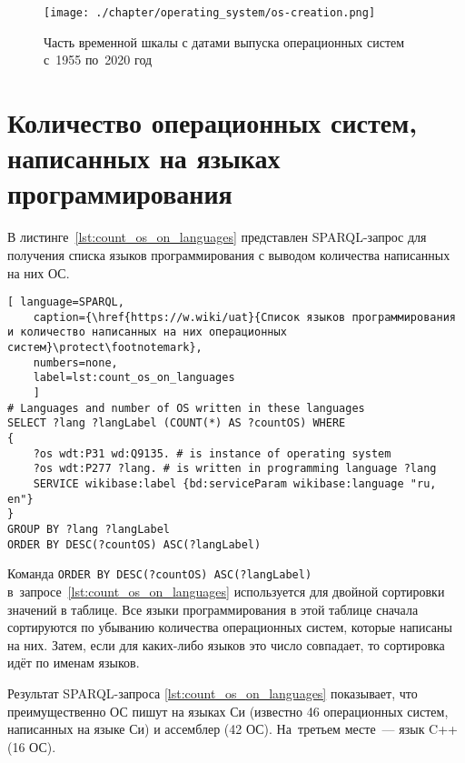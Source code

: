 \begin{figure*}[h!]
	\texttt{[image: ./chapter/operating\_system/os-creation.png]}
    \caption[Часть временной шкалы с датами выпуска ОС.]{Часть временной шкалы с датами выпуска операционных систем с~1955 по~2020 год}%
	\label{fig:os_creation}
\end{figure*}





\section{Количество операционных систем, написанных на языках программирования}

В листинге~\ref{lst:count_os_on_languages} представлен SPARQL-запрос для получения списка языков программирования с выводом количества написанных на них ОС.

\begin{lstlisting}[ language=SPARQL, 
	caption={\href{https://w.wiki/uat}{Список языков программирования и количество написанных на них операционных систем}\protect\footnotemark},
    numbers=none,
	label=lst:count_os_on_languages
	]
# Languages and number of OS written in these languages
SELECT ?lang ?langLabel (COUNT(*) AS ?countOS) WHERE 
{
	?os wdt:P31 wd:Q9135. # is instance of operating system
	?os wdt:P277 ?lang. # is written in programming language ?lang
    SERVICE wikibase:label {bd:serviceParam wikibase:language "ru, en"}
}
GROUP BY ?lang ?langLabel
ORDER BY DESC(?countOS) ASC(?langLabel)
\end{lstlisting}



\newpage\phantom{blabla}
\newpage
Команда \lstinline|ORDER BY DESC(?countOS) ASC(?langLabel)| в~запросе~\ref{lst:count_os_on_languages} 
используется для двойной сортировки значений в таблице. 
Все языки программирования в этой таблице сначала сортируются по убыванию количества операционных систем, 
которые написаны на них. Затем, если для каких-либо языков это число совпадает, 
то сортировка идёт по именам языков.

Результат SPARQL-запроса \ref{lst:count_os_on_languages} показывает, 
что преимущественно ОС пишут на языках Си (известно 46 операционных систем, написанных на языке Си) и ассемблер (42 ОС). 
На~третьем месте~--- язык C++ (16 ОС).



